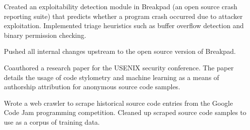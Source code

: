 \documentclass[]{template}
\begin{document}
\hfill
{}
\begin{tightemize}
\item
  Created an exploitability detection module in Breakpad (an open source crash
  reporting suite) that predicts whether a program crash occurred due to
  attacker exploitation.
  Implemented triage heuristics such as buffer overflow detection and binary
  permission checking.
\item
  Pushed all internal changes upstream to the open source version of Breakpad.
\end{tightemize}

\sectionsep

\hfill
{}
\begin{tightemize}
\item
  Coauthored a research paper for the USENIX security conference.
  The paper details the usage of code stylometry and machine learning as a means
  of authorship attribution for anonymous source code samples.
\item
  Wrote a web crawler to scrape historical source code entries from the Google
  Code Jam programming competition.
  Cleaned up scraped source code samples to use as a corpus of training data.
\end{tightemize}

\lastupdated
\end{document}
